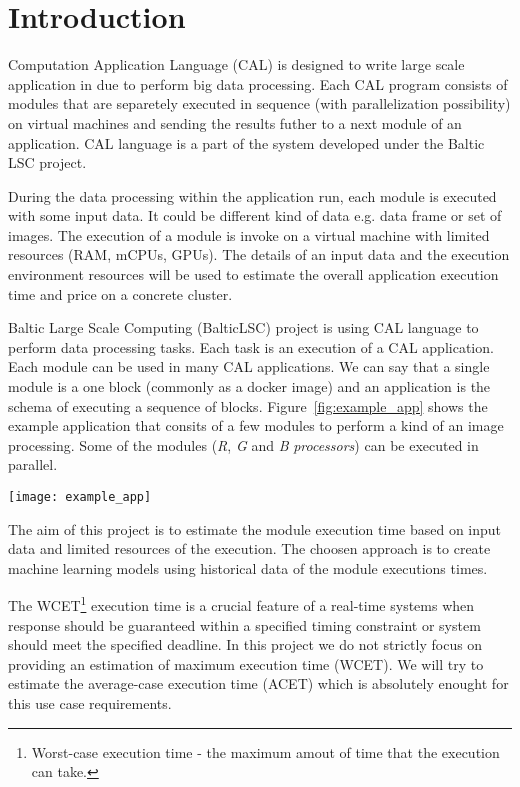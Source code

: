 \section{Introduction}

Computation Application Language (CAL) is designed to write large scale application in due to perform big data processing. Each CAL program consists of modules that are separetely executed in sequence (with parallelization possibility) on virtual machines and sending the results futher to a next module of an application. CAL language is a part of the system developed under the Baltic LSC\cite{baltic_lsc_website} project.

During the data processing within the application run, each module is executed with some input data. It could be different kind of data e.g. data frame or set of images. The execution of a module is invoke on a virtual machine with limited resources (RAM, mCPUs, GPUs). The details of an input data and the execution environment resources will be used to estimate the overall application execution time and price on a concrete cluster.

Baltic Large Scale Computing (BalticLSC\cite{baltic_lsc}) project is using CAL language to perform data processing tasks. Each task is an execution of a CAL application. Each module can be used in many CAL applications. We can say that a single module is a one block (commonly as a docker image) and an application is the schema of executing a sequence of blocks. Figure~\ref{fig:example_app} shows the example application that consits of a few modules to perform a kind of an image processing. Some of the modules (\textit{R}, \textit{G} and \textit{B} \textit{processors}) can be executed in parallel.

\begin{figure*}[!t]
	\centering
	\begin{minipage}{0.9\linewidth}
	\texttt{[image: example\_app]}
	\end{minipage}
	\caption{The example of an image processing application written in the CAL language.}
	\label{fig:example_app}
\end{figure*}

The aim of this project is to estimate the module execution time based on input data and limited resources of the execution. The choosen approach is to create machine learning models using historical data of the module executions times.

The WCET\footnote{Worst-case execution time - the maximum amout of time that the execution can take.} execution time is a crucial feature of a real-time systems\cite{wcet} when response should be guaranteed within a specified timing constraint or system should meet the specified deadline. In this project we do not strictly focus on providing an estimation of maximum execution time (WCET). We will try to estimate the average-case execution time (ACET) which is absolutely enought for this use case requirements.